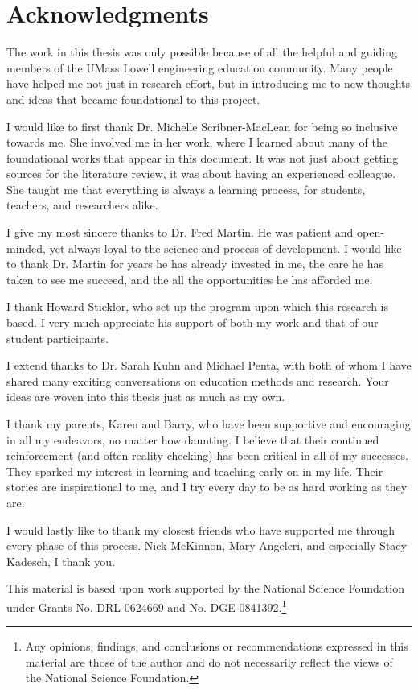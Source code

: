 \chapter*{Acknowledgments}
\renewcommand{\thefootnote}{\fnsymbol{footnote}}

The work in this thesis was only possible because of all the helpful and guiding members of the UMass Lowell engineering education community. Many people have helped me not just in research effort, but in introducing me to new thoughts and ideas that became foundational to this project.

I would like to first thank Dr. Michelle Scribner-MacLean for being so inclusive towards me. She involved me in her work, where I learned about many of the foundational works that appear in this document. It was not just about getting sources for the literature review, it was about having an experienced colleague.  She taught me that everything is always a learning process, for students, teachers, and researchers alike.

I give my most sincere thanks to Dr. Fred Martin. He was patient and open-minded, yet always loyal to the science and process of development. I would like to thank Dr. Martin for years he has already invested in me, the care he has taken to see me succeed, and the all the opportunities he has afforded me. 

I thank Howard Sticklor, who set up the program upon which this research is based. I very much appreciate his support of both my work and that of our student participants.

I extend thanks to Dr. Sarah Kuhn and Michael Penta, with both of whom I have shared many exciting conversations on education methods and research.  Your ideas are woven into this thesis just as much as my own.

I thank my parents, Karen and Barry, who have been supportive and encouraging in all my endeavors, no matter how daunting. I believe that their continued reinforcement (and often reality checking)  has been critical in all of my successes. They sparked my interest in learning and teaching early on in my life. Their stories are inspirational to me, and I try every day to be as hard working as they are.

I would lastly like to thank my closest friends who have supported me through every phase of this process. Nick McKinnon, Mary Angeleri, and especially Stacy Kadesch, I thank you.

This material is based upon work supported by the National Science Foundation under Grants No. DRL-0624669 and No. DGE-0841392.\footnote{Any opinions, findings, and conclusions or recommendations expressed in this material are those of the author and do not necessarily reflect the views of the National Science Foundation.}